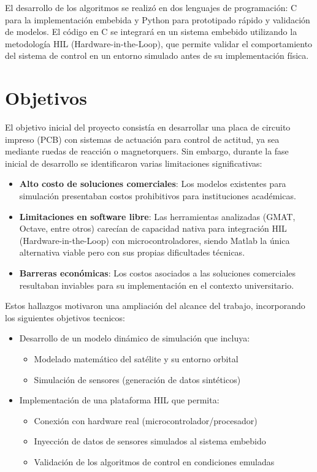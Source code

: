 	El desarrollo de los algoritmos se realizó en dos lenguajes de programación: C para la implementación embebida y Python para prototipado rápido y validación de modelos. El código en C se integrará en un sistema embebido utilizando la metodología HIL (Hardware-in-the-Loop), que permite validar el comportamiento del sistema de control en un entorno simulado antes de su implementación física.





\section{Objetivos}

El objetivo inicial del proyecto consistía en desarrollar una placa de circuito impreso (PCB) con sistemas de actuación para control de actitud, ya sea mediante ruedas de reacción o magnetorquers. Sin embargo, durante la fase inicial de desarrollo se identificaron varias limitaciones significativas:

\begin{itemize}
	\item \textbf{Alto costo de soluciones comerciales}: Los modelos existentes para simulación presentaban costos prohibitivos para instituciones académicas.
	\item \textbf{Limitaciones en software libre}: Las herramientas analizadas (GMAT, Octave, entre otros) carecían de capacidad nativa para integración HIL (Hardware-in-the-Loop) con microcontroladores, siendo Matlab la única alternativa viable pero con sus propias dificultades técnicas.
	\item \textbf{Barreras económicas}: Los costos asociados a las soluciones comerciales resultaban inviables para su implementación en el contexto universitario.
\end{itemize}
Estos hallazgos motivaron una ampliación del alcance del trabajo, incorporando los siguientes objetivos tecnicos:

\begin{itemize}
	\item Desarrollo de un modelo dinámico de simulación que incluya:
	\begin{itemize}
		\item Modelado matemático del satélite y su entorno orbital
		\item Simulación de sensores (generación de datos sintéticos)
	\end{itemize}
	\item Implementación de una plataforma HIL que permita:
	\begin{itemize}
		\item Conexión con hardware real (microcontrolador/procesador)
		\item Inyección de datos de sensores simulados al sistema embebido
		\item Validación de los algoritmos de control en condiciones emuladas
	\end{itemize}
\end{itemize}


